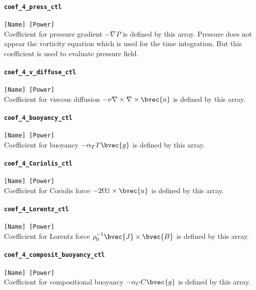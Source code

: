 \paragraph{\tt coef\_4\_press\_ctl}
\label{href_t:coef_4_press_ctl}
\verb|[Name] [Power]| \\
Coefficient for pressure gradient $-\nabla P$ is defined by this array. Pressure does not appear the vorticity equation which is used for the time integration. But this coefficient is used to evaluate pressure field.

\paragraph{\tt coef\_4\_v\_diffuse\_ctl}
\label{href_t:coef_4_v_diffuse_ctl}
\verb|[Name] [Power]| \\
Coefficient for viscous diffusion $- \nu \nabla \times \nabla \times \bvec{u}$ is defined by this array.

\paragraph{\tt coef\_4\_buoyancy\_ctl}
\label{href_t:coef_4_buoyancy_ctl}
\verb|[Name] [Power]| \\
Coefficient for buoyancy $- \alpha_{T} T \bvec{g}$ is defined by this array.

\paragraph{\tt coef\_4\_Coriolis\_ctl}
\label{href_t:coef_4_Coriolis_ctl}
\verb|[Name] [Power]| \\
Coefficient for Coriolis force $-2 \Omega \hat{z} \times \bvec{u}$ is defined by this array.

\paragraph{\tt coef\_4\_Lorentz\_ctl}
\label{href_t:coef_4_Lorentz_ctl}
\verb|[Name] [Power]| \\
Coefficient for Lorentz force $ \rho_{0}^{-1} \bvec{J} \times \bvec{B}$ is defined by this array.

\paragraph{\tt coef\_4\_composit\_buoyancy\_ctl}
\label{href_t:coef_4_composit_buoyancy_ctl}
\verb|[Name] [Power]| \\
Coefficient for compositional buoyancy $ -\alpha_{C} C \bvec{g}$ is defined by this array.

